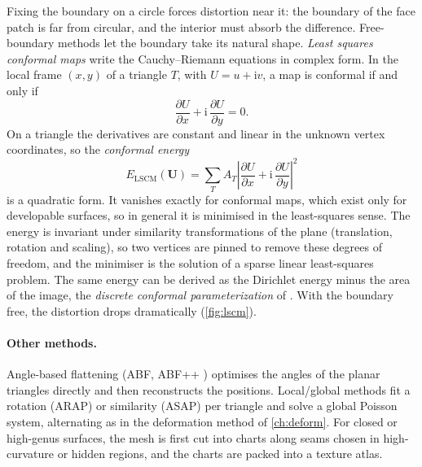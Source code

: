 Fixing the boundary on a circle forces distortion near it: the boundary of the face patch is far
from circular, and the interior must absorb the difference. Free-boundary methods let the boundary
take its natural shape. \emph{Least squares conformal maps} \citep{Levy2002} write the
Cauchy--Riemann equations in complex form. In the local frame $(x,y)$ of a triangle $T$, with
$U=u+\mathrm iv$, a map is conformal if and only if
\begin{equation}
\frac{\partial U}{\partial x}+\mathrm i\,\frac{\partial U}{\partial y}=0 .
\end{equation}
On a triangle the derivatives are constant and linear in the unknown vertex coordinates, so the
\emph{conformal energy}
\begin{equation}
E_{\mathrm{LSCM}}(\mathbf U)=\sum_TA_T\left|\frac{\partial U}{\partial x}+\mathrm i\,\frac{\partial U}{\partial y}\right|^2
\end{equation}
is a quadratic form. It vanishes exactly for conformal maps, which exist only for developable
surfaces, so in general it is minimised in the least-squares sense. The energy is invariant under
similarity transformations of the plane (translation, rotation and scaling), so two vertices are
pinned to remove these degrees of freedom, and the minimiser is the solution of a sparse linear
least-squares problem. The same energy can be derived as the Dirichlet energy minus the area of the
image, the \emph{discrete conformal parameterization} of \citet{Desbrun2002}. With the boundary free,
the distortion drops dramatically (\cref{fig:lscm}).


\paragraph{Other methods.} Angle-based flattening (ABF, ABF++ \citep{Sheffer2005}) optimises the
angles of the planar triangles directly and then reconstructs the positions. Local/global methods
\citep{Liu2008} fit a rotation (ARAP) or similarity (ASAP) per triangle and solve a global Poisson
system, alternating as in the deformation method of \cref{ch:deform}. For closed or high-genus
surfaces, the mesh is first cut into charts along seams chosen in high-curvature or hidden regions,
and the charts are packed into a texture atlas.

